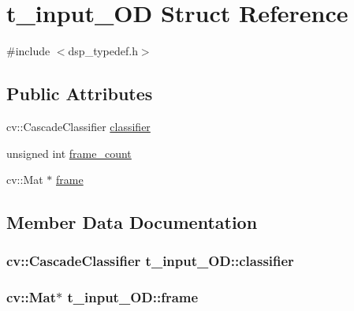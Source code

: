 \hypertarget{structt__input__OD}{}\section{t\+\_\+input\+\_\+\+OD Struct Reference}
\label{structt__input__OD}


{\ttfamily \#include $<$dsp\+\_\+typedef.\+h$>$}

\subsection*{Public Attributes}
\begin{DoxyCompactItemize}
\item 
cv\+::\+Cascade\+Classifier \hyperlink{structt__input__OD_a2294c246ff2f7923d6555d8e0d0474d1}{classifier}
\item 
unsigned int \hyperlink{structt__input__OD_a47c7f66e3f1c0151e83a6606ad303fb9}{frame\+\_\+count}
\item 
cv\+::\+Mat $\ast$ \hyperlink{structt__input__OD_aedc404bc761ab3c9ca6f86d75df4a088}{frame}
\end{DoxyCompactItemize}


\subsection{Member Data Documentation}
\subsubsection[{\texorpdfstring{classifier}{classifier}}]{\setlength{\rightskip}{0pt plus 5cm}cv\+::\+Cascade\+Classifier t\+\_\+input\+\_\+\+O\+D\+::classifier}\hypertarget{structt__input__OD_a2294c246ff2f7923d6555d8e0d0474d1}{}\label{structt__input__OD_a2294c246ff2f7923d6555d8e0d0474d1}
\subsubsection[{\texorpdfstring{frame}{frame}}]{\setlength{\rightskip}{0pt plus 5cm}cv\+::\+Mat$\ast$ t\+\_\+input\+\_\+\+O\+D\+::frame}\hypertarget{structt__input__OD_aedc404bc761ab3c9ca6f86d75df4a088}{}\label{structt__input__OD_aedc404bc761ab3c9ca6f86d75df4a088}
